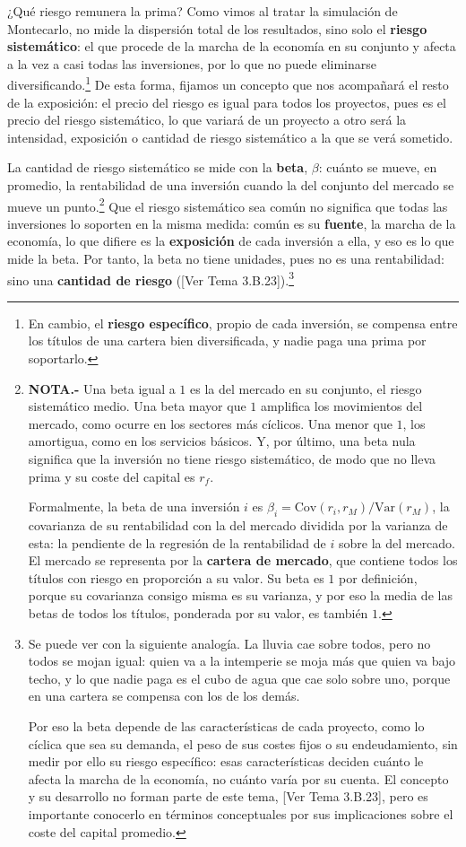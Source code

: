 \documentclass[10pt,a4paper]{article}
\newcommand{\authorfont}[1]{{\fontfamily{EBGaramond-TLF}\selectfont #1}}
\begin{document}
¿Qué riesgo remunera la prima? Como vimos al tratar la simulación de Montecarlo, no mide la dispersión total de los resultados, sino solo el \textbf{riesgo sistemático}: el que procede de la marcha de la economía en su conjunto y afecta a la vez a casi todas las inversiones, por lo que no puede eliminarse diversificando.\footnote{%
  En cambio, el \textbf{riesgo específico}, propio de cada inversión, se compensa entre los títulos de una cartera bien diversificada, y nadie paga una prima por soportarlo.
} De esta forma, fijamos un concepto que nos acompañará el resto de la exposición: el precio del riesgo es igual para todos los proyectos, pues es el precio del riesgo sistemático, lo que variará de un proyecto a otro será la intensidad, exposición o cantidad de riesgo sistemático a la que se verá sometido.

La cantidad de riesgo sistemático se mide con la \textbf{beta}, $\beta$: cuánto se mueve, en promedio, la rentabilidad de una inversión cuando la del conjunto del mercado se mueve un punto.\footnote{%
    \textbf{NOTA.-} Una beta igual a $1$ es la del mercado en su conjunto, el riesgo sistemático medio. Una beta mayor que $1$ amplifica los movimientos del mercado, como ocurre en los sectores más cíclicos. Una menor que $1$, los amortigua, como en los servicios básicos. Y, por último, una beta nula significa que la inversión no tiene riesgo sistemático, de modo que no lleva prima y su coste del capital es $r_f$.

    Formalmente, la beta de una inversión $i$ es $\beta_i=\text{Cov}(r_i,r_M)/\text{Var}(r_M)$, la covarianza de su rentabilidad con la del mercado dividida por la varianza de esta: la pendiente de la regresión de la rentabilidad de $i$ sobre la del mercado. El mercado se representa por la \textbf{cartera de mercado}, que contiene todos los títulos con riesgo en proporción a su valor. Su beta es $1$ por definición, porque su covarianza consigo misma es su varianza, y por eso la media de las betas de todos los títulos, ponderada por su valor, es también $1$.
} Que el riesgo sistemático sea común no significa que todas las inversiones lo soporten en la misma medida: común es su \textbf{fuente}, la marcha de la economía, lo que difiere es la \textbf{exposición} de cada inversión a ella, y eso es lo que mide la beta. Por tanto, la beta no tiene unidades, pues no es una rentabilidad: sino una \textbf{cantidad de riesgo} ([\authorfont{Ver Tema 3.B.23}]).\footnote{%
    Se puede ver con la siguiente analogía. La lluvia cae sobre todos, pero no todos se mojan igual: quien va a la intemperie se moja más que quien va bajo techo, y lo que nadie paga es el cubo de agua que cae solo sobre uno, porque en una cartera se compensa con los de los demás. 
    
    Por eso la beta depende de las características de cada proyecto, como lo cíclica que sea su demanda, el peso de sus costes fijos o su endeudamiento, sin medir por ello su riesgo específico: esas características deciden cuánto le afecta la marcha de la economía, no cuánto varía por su cuenta. El concepto y su desarrollo no forman parte de este tema, [\authorfont{Ver Tema 3.B.23}], pero es importante conocerlo en términos conceptuales por sus implicaciones sobre el coste del capital promedio.
}
\end{document}
